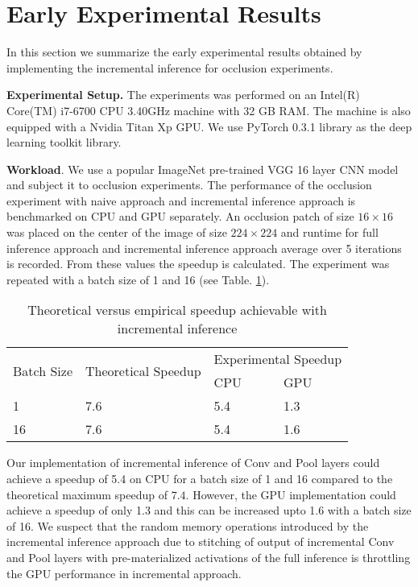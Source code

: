 \section{Early Experimental Results}
In this section we summarize the early experimental results obtained by implementing the incremental inference for occlusion experiments.

\textbf{Experimental Setup.} The experiments was performed on an Intel(R) Core(TM) i7-6700 CPU 3.40GHz machine with 32 GB RAM. The machine is also equipped with a Nvidia Titan Xp GPU. We use PyTorch 0.3.1 library as the deep learning toolkit library.

\textbf{Workload}. We use a popular ImageNet pre-trained VGG 16 layer CNN model and subject it to occlusion experiments. The performance of the occlusion experiment with naive approach and incremental inference approach is benchmarked on CPU and GPU separately.
An occlusion patch of size $16\times16$ was placed on the center of the image of size $224\times224$ and runtime for full inference approach and incremental inference approach average over 5 iterations is recorded. From these values the speedup is calculated. The experiment was repeated with a batch size of 1 and 16 (see Table. \ref{table:speedup}).

\begin{table}[h]
\centering
\begin{tabular}{|l|l|l|l|}
\hline
\multirow{2}{*}{Batch Size} & \multirow{2}{*}{Theoretical Speedup} & \multicolumn{2}{l|}{Experimental Speedup} \\ \cline{3-4} 
 &  & CPU & GPU \\ \hline
1 & 7.6 & 5.4 & 1.3 \\ \hline
16 & 7.6 & 5.4 & 1.6 \\ \hline
\end{tabular}
\caption{Theoretical versus empirical speedup achievable with incremental inference}
\label{table:speedup}
\end{table}
\vspace{-5.mm}

Our implementation of incremental inference of Conv and Pool layers could achieve a speedup of 5.4 on CPU for a batch size of 1 and 16 compared to the theoretical maximum speedup of $7.4$. However, the GPU implementation could achieve a speedup of only 1.3 and this can be increased upto 1.6 with a batch size of 16. We suspect that the random memory operations introduced by the incremental inference approach due to stitching of output of incremental Conv and Pool layers with pre-materialized activations of the full inference is  throttling the GPU performance in incremental approach.

